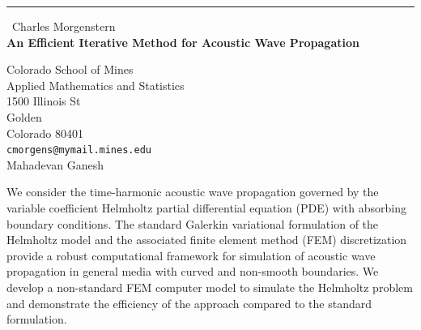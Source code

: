 \documentclass{report}
\begin{document}
\begin{center}
\rule{6in}{1pt} \
{\large Charles Morgenstern \\
{\bf An Efficient Iterative Method for Acoustic Wave Propagation}}

Colorado School of Mines \\ Applied Mathematics and Statistics \\ 1500 Illinois St \\ Golden \\ Colorado 80401
\\
{\tt cmorgens@mymail.mines.edu}\\
Mahadevan Ganesh\end{center}

We consider the time-harmonic acoustic wave propagation governed by the
variable coefficient Helmholtz partial differential equation (PDE) with
absorbing boundary conditions. The standard Galerkin variational
formulation of the Helmholtz model and the associated finite element
method (FEM) discretization provide a robust computational framework for
simulation of acoustic wave propagation in general media with curved and
non-smooth boundaries. We develop a non-standard FEM computer model to
simulate the Helmholtz problem and demonstrate the efficiency of the
approach compared to the standard formulation.
\end{document}
